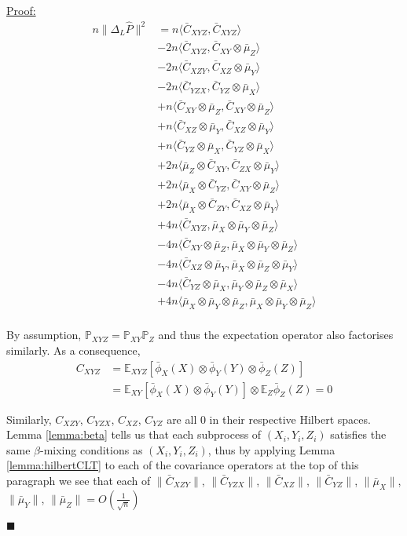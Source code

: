 \documentclass{article}
\newenvironment{claimproof}[1]{\par\noindent\underline{Proof:}\space#1}{\hfill $\blacksquare$}
\begin{document}
\begin{claimproof}
\begin{align*}
n\|\Delta_L \hat{P}\|^2 &= n\langle \bar{C}_{XYZ},\bar{C}_{XYZ} \rangle \\& -
2n\langle \bar{C}_{XYZ},\bar{C}_{XY}\otimes\bar{\mu}_Z \rangle \\& -
2n\langle \bar{C}_{XZY},\bar{C}_{XZ}\otimes\bar{\mu}_Y \rangle \\& -
2n\langle \bar{C}_{YZX},\bar{C}_{YZ}\otimes\bar{\mu}_X \rangle \\& +
n\langle \bar{C}_{XY}\otimes\bar{\mu}_Z,\bar{C}_{XY}\otimes\bar{\mu}_Z \rangle \\& +
n\langle \bar{C}_{XZ}\otimes\bar{\mu}_Y,\bar{C}_{XZ}\otimes\bar{\mu}_Y \rangle \\& +
n\langle \bar{C}_{YZ}\otimes\bar{\mu}_X,\bar{C}_{YZ}\otimes\bar{\mu}_X \rangle \\& +
2n\langle \bar{\mu}_Z\otimes\bar{C}_{XY},\bar{C}_{ZX}\otimes\bar{\mu}_Y \rangle \\& +
2n\langle \bar{\mu}_X\otimes\bar{C}_{YZ},\bar{C}_{XY}\otimes\bar{\mu}_Z \rangle \\& +
2n\langle \bar{\mu}_X\otimes\bar{C}_{ZY},\bar{C}_{XZ}\otimes\bar{\mu}_Y \rangle \\& +
4n\langle \bar{C}_{XYZ},\bar{\mu}_X \otimes\bar{\mu}_Y \otimes \bar{\mu}_Z \rangle \\& -
4n\langle \bar{C}_{XY}\otimes \bar{\mu}_Z,\bar{\mu}_X \otimes\bar{\mu}_Y \otimes \bar{\mu}_Z \rangle \\& -
4n\langle \bar{C}_{XZ}\otimes \bar{\mu}_Y,\bar{\mu}_X \otimes\bar{\mu}_Z \otimes \bar{\mu}_Y \rangle \\& -
4n\langle \bar{C}_{YZ}\otimes \bar{\mu}_X,\bar{\mu}_Y \otimes\bar{\mu}_Z \otimes \bar{\mu}_X \rangle \\& +
4n\langle \bar{\mu}_X \otimes\bar{\mu}_Y \otimes \bar{\mu}_Z,\bar{\mu}_X \otimes\bar{\mu}_Y \otimes \bar{\mu}_Z \rangle \\
\end{align*}

By assumption, $\mathbb{P}_{XYZ} =\mathbb{P}_{XY}\mathbb{P}_{Z}$ and thus the expectation operator also factorises similarly. As a consequence, 
\begin{align*}
C_{XYZ} &= \mathbb{E}_{XYZ}[\bar\phi_X(X)\otimes\bar\phi_Y(Y)\otimes\bar\phi_Z(Z)] \\
& = \mathbb{E}_{XY}[\bar\phi_X(X)\otimes\bar\phi_Y(Y)]\otimes\mathbb{E}_{Z}\bar\phi_Z(Z)=0
\end{align*}

Similarly, $C_{XZY}$, $C_{YZX}$, $C_{XZ}$, $C_{YZ}$ are all 0 in their respective Hilbert spaces. Lemma \ref{lemma:beta} tells us that each subprocess of $(X_i,Y_i,Z_i)$ satisfies the same $\beta$-mixing conditions as $(X_i,Y_i,Z_i)$, thus by applying Lemma \ref{lemma:hilbertCLT} to each of the covariance operators at the top of this paragraph we see that each of $\|\bar{C}_{XZY}\|$, $\|\bar{C}_{YZX}\|$, $\|\bar{C}_{XZ}\|$, $\|\bar{C}_{YZ}\|$, $\|\bar{\mu}_X\|$, $\|\bar{\mu}_Y\|$, $\|\bar{\mu}_Z\| = O\left(\frac{1}{\sqrt{n}}\right)$


\end{claimproof}
\end{document}
